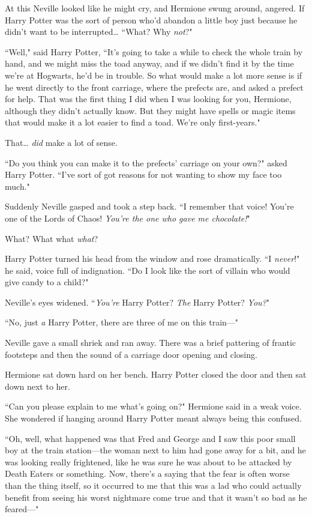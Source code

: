 At this Neville looked like he might cry, and Hermione swung around, angered. If Harry Potter was the sort of person who'd abandon a little boy just because he didn't want to be interrupted{\ldots} ``What? Why \emph{not}?"

``Well," said Harry Potter, ``It's going to take a while to check the whole train by hand, and we might miss the toad anyway, and if we didn't find it by the time we're at Hogwarts, he'd be in trouble. So what would make a lot more sense is if he went directly to the front carriage, where the prefects are, and asked a prefect for help. That was the first thing I did when I was looking for you, Hermione, although they didn't actually know. But they might have spells or magic items that would make it a lot easier to find a toad. We're only first-years."

That{\ldots} \emph{did} make a lot of sense.

``Do you think you can make it to the prefects' carriage on your own?" asked Harry Potter. ``I've sort of got reasons for not wanting to show my face too much."

Suddenly Neville gasped and took a step back. ``I remember that voice! You're one of the Lords of Chaos! \emph{You're the one who gave me chocolate!}"

What? What what \emph{what}?

Harry Potter turned his head from the window and rose dramatically. ``I \emph{never}!" he said, voice full of indignation. ``Do I look like the sort of villain who would give candy to a child?"

Neville's eyes widened. ``\emph{You're} Harry Potter? \emph{The} Harry Potter? \emph{You?}"

``No, just \emph{a} Harry Potter, there are three of me on this train—"

Neville gave a small shriek and ran away. There was a brief pattering of frantic footsteps and then the sound of a carriage door opening and closing.

Hermione sat down hard on her bench. Harry Potter closed the door and then sat down next to her.

``Can you please explain to me what's going on?" Hermione said in a weak voice. She wondered if hanging around Harry Potter meant always being this confused.

``Oh, well, what happened was that Fred and George and I saw this poor small boy at the train station—the woman next to him had gone away for a bit, and he was looking really frightened, like he was sure he was about to be attacked by Death Eaters or something. Now, there's a saying that the fear is often worse than the thing itself, so it occurred to me that this was a lad who could actually benefit from seeing his worst nightmare come true and that it wasn't so bad as he feared—"

